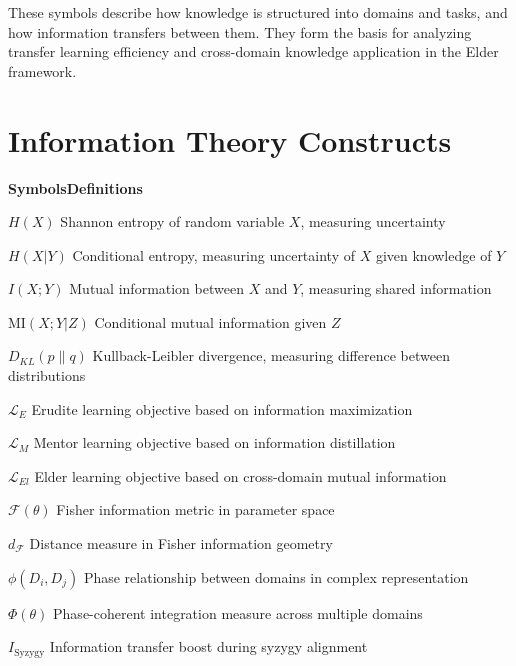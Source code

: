 \vspace{1cm}
\begin{center}
These symbols describe how knowledge is structured into domains and tasks, and how information transfers between them. They form the basis for analyzing transfer learning efficiency and cross-domain knowledge application in the Elder framework.
\end{center}

\clearpage
\chapter*{Information Theory Constructs}

\begin{multicols}{2}
\noindent\textbf{\large Symbols}\hfill\textbf{\large Definitions}

\vspace{0.3cm}
\noindent$H(X)$ \dotfill Shannon entropy of random variable $X$, measuring uncertainty

\noindent$H(X|Y)$ \dotfill Conditional entropy, measuring uncertainty of $X$ given knowledge of $Y$

\noindent$I(X;Y)$ \dotfill Mutual information between $X$ and $Y$, measuring shared information

\noindent$\text{MI}(X;Y|Z)$ \dotfill Conditional mutual information given $Z$

\noindent$D_{KL}(p \| q)$ \dotfill Kullback-Leibler divergence, measuring difference between distributions

\noindent$\mathcal{L}_E$ \dotfill Erudite learning objective based on information maximization

\noindent$\mathcal{L}_M$ \dotfill Mentor learning objective based on information distillation

\noindent$\mathcal{L}_{El}$ \dotfill Elder learning objective based on cross-domain mutual information

\noindent$\mathcal{F}(\theta)$ \dotfill Fisher information metric in parameter space

\noindent$d_{\mathcal{F}}$ \dotfill Distance measure in Fisher information geometry

\noindent$\phi(D_i, D_j)$ \dotfill Phase relationship between domains in complex representation

\noindent$\Phi(\theta)$ \dotfill Phase-coherent integration measure across multiple domains

\noindent$I_{\text{Syzygy}}$ \dotfill Information transfer boost during syzygy alignment


\end{multicols}
